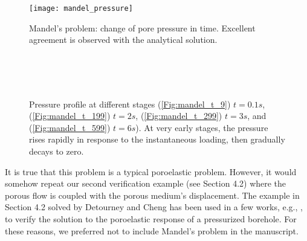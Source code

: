 \begin{figure}[htbp]
	\centering
	\texttt{[image: mandel\_pressure]}
	\caption{Mandel's problem: change of pore pressure in time. Excellent agreement is observed with the analytical solution.}
	\label{Fig:mandel_pressure}
\end{figure}
\begin{figure}[htbp]
	\centering %
	\subfloat[]{\texttt{[image: t9]}\label{Fig:mandel_t_9}}
	\\
	\subfloat[]{\texttt{[image: t199]}\label{Fig:mandel_t_199}}
	\\
	\subfloat[]{\texttt{[image: t299]}\label{Fig:mandel_t_299}}
	\\
	\subfloat[]{\texttt{[image: t599]}\label{Fig:mandel_t_599}}
	\caption{Pressure profile at different stages (\ref{Fig:mandel_t_9}) $t=0.1s$, (\ref{Fig:mandel_t_199}) $t=2s$, (\ref{Fig:mandel_t_299}) $t=3s$, and (\ref{Fig:mandel_t_599}) $t=6s$). At very early stages, the pressure rises  rapidly in response to the instantaneous loading, then gradually decays to zero. %
	}
	\label{Fig:mandel_snapshots}
\end{figure}
It is true that this problem is a typical poroelastic problem. However, it would somehow repeat our second verification example (see Section 4.2) where the porous flow is coupled with the porous medium's displacement. The example in Section 4.2 solved by Detourney and Cheng \cite{detournay1988poroelastic} has been used in a few works, e.g., \cite{wang2018influence, lu2013microcrack}, to verify the solution to the poroelastic response of a pressurized borehole. For these reasons, we preferred not to include Mandel's problem in the manuscript.